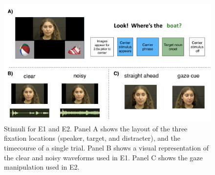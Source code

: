 \documentclass[10pt, letterpaper]{article}
\newenvironment{CodeChunk}{}{}
\begin{document}
\begin{CodeChunk}
\begin{figure}[tb]

{\centering \includegraphics[width=0.95\linewidth]{figs/stimuli_plot-1} 

}

\caption[Stimuli for E1 and E2]{Stimuli for E1 and E2. Panel A shows the layout of the three fixation locations (speaker, target, and distracter), and the timecourse of a single trial. Panel B shows a visual representation of the clear and noisy waveforms used in E1. Panel C shows the gaze manipulation used in E2.}\label{fig:stimuli_plot}
\end{figure}
\end{CodeChunk}
\end{document}
